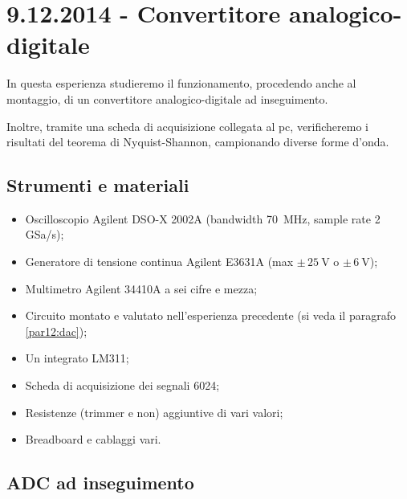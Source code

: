 \section{9.12.2014 - Convertitore analogico-digitale}

In questa esperienza studieremo il funzionamento, procedendo anche al montaggio, di un convertitore analogico-digitale ad inseguimento.

Inoltre, tramite una scheda di acquisizione collegata al pc, verificheremo i risultati del teorema di Nyquist-Shannon, campionando diverse forme d'onda.

\subsection*{Strumenti e materiali}

\begin{itemize} [noitemsep]
	\item Oscilloscopio Agilent DSO-X 2002A (bandwidth \SI{70}{\mega\hertz}, sample rate \num{2} GSa/s);
	\item Generatore di tensione continua Agilent E3631A (max $\pm \, \SI{25}{\volt}$ o $\pm \, \SI{6}{\volt}$);
	\item Multimetro Agilent 34410A a sei cifre e mezza;
	\item Circuito montato e valutato nell'esperienza precedente (si veda il paragrafo \ref{par12:dac});
\item Un integrato LM311;	
\item Scheda di acquisizione dei segnali 6024;
\item Resistenze (trimmer e non) aggiuntive di vari valori;
\item Breadboard e cablaggi vari.
\end{itemize}

\subsection{ADC ad inseguimento}

